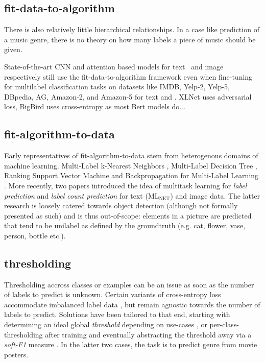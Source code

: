 \subsection{fit-data-to-algorithm}

There is also relatively little hierarchical relationships. In a case like prediction of a music genre, there is no theory on how many labels a piece of music should be given.

State-of-the-art CNN and attention based models for text~\cite{XLNet, bigBird, } and image respectively still use the fit-data-to-algorithm framework even when fine-tuning for multilabel classification tasks on datasets like IMDB, Yelp-2, Yelp-5, DBpedia, AG, Amazon-2, and Amazon-5 for text and .  XLNet uses adversarial loss, BigBird uses cross-entropy as most Bert models do...

\subsection{fit-algorithm-to-data}




Early representatives of fit-algorithm-to-data stem from heterogenous
domains of machine learning. Multi-Label k-Nearest Neighbors \cite{ML-KNN},
Multi-Label Decision Tree \cite{ML-DT}, Ranking Support Vector Machine
\cite{multilabelSVM} and Backpropagation for Multi-Label Learning
\cite{multilabelBackprop}. More recently, two papers introduced the idea of
multitask learning for \emph{label prediction} and \emph{label count
prediction} for text (ML\(_{\text{NET}}\)) \cite{multitaskLabel} and image
\cite{multitaskLabelImages, tencent} data. The latter research is loosely catered
towards object detection (although not formally presented as such) and is thus
out-of-scope: elements in a picture are predicted that tend to be unilabel as
defined by the groundtruth (e.g. cat, flower, vase, person, bottle etc.).


\subsection{thresholding}

Thresholding accross classes or examples can be an issue as soon as the number of labels to predict is unknown. Certain variants of cross-entropy loss accommodate imbalanced label data  \cite{focalLoss}, but remain agnostic towards the number of labels to predict. Solutions have been tailored to that end, starting with determining an ideal global \emph{threshold} depending on use-cases \cite{threshForF1}, or per-class-thresholding after training \cite{moviePosters} and eventually abstracting the threshold away via a \emph{soft-F1} measure \cite{softF1}. In the latter two cases, the task is to predict genre from movie posters.

